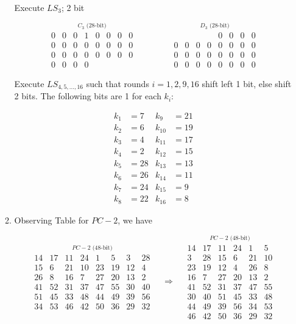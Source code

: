 \documentclass[12pt]{article}
\begin{document}
\begin{enumerate}
\begin{enumerate}
			Execute $LS_3$; 2 bit
			
			\[
			\stackrel{\mbox{$C_3$ (28-bit)}}{
				\begin{matrix}
					0&0&0&1&0&0&0&0\\ 
					0&0&0&0&0&0&0&0\\
					0&0&0&0&0&0&0&0\\
					0&0&0&0
				\end{matrix}}\quad\quad\quad\quad
			\stackrel{\mbox{$D_3$ (28-bit)}}{
				\begin{matrix}
					{}&{}&{}&{}&0&0&0&0\\ 
					0&0&0&0&0&0&0&0\\
					0&0&0&0&0&0&0&0\\
					0&0&0&0&0&0&0&0
				\end{matrix}}
			\]
			
			\newpage
			Execute $LS_{4,5,...,16}$ such that rounds $i=1,2,9,16$ shift left 1 bit, else shift 2 bits. The following bits are 1 for each $k_i$:
			
			\begin{align*}
			k_1 &= 7 & k_9 &= 21\\
			k_2 &= 6 & k_{10} &= 19\\
			k_3 &= 4 & k_{11} &= 17\\
			k_4 &= 2 & k_{12} &= 15\\
			k_5 &= 28 & k_{13} &= 13\\
			k_6 &= 26 & k_{14} &= 11\\
			k_7 &= 24 & k_{15} &= 9\\
			k_8 &= 22 & k_{16} &= 8
			\end{align*}
			
		\item
			Observing Table for $PC-2$, we have
			
			\[
			\stackrel{\mbox{$PC-2$ (48-bit)}}{
				\begin{matrix}
					14&17&11&24&1&5&3&28\\ 
					15&6&21&10&23&19&12&4\\
					26&8&16&7&27&20&13&2\\
					41&52&31&37&47&55&30&40\\
					51&45&33&48&44&49&39&56\\
					34&53&46&42&50&36&29&32
				\end{matrix}}
			\quad\Rightarrow\quad
			\stackrel{\mbox{$PC-2$ (48-bit)}}{
				\begin{matrix}
					14&17&11&24&1&5\\
					3&28&15&6&21&10\\
					23&19&12&4&26&8\\
					16&7&27&20&13&2\\
					41&52&31&37&47&55\\
					30&40&51&45&33&48\\
					44&49&39&56&34&53\\
					46&42&50&36&29&32
				\end{matrix}}
			\]
			

\end{enumerate}
\end{enumerate}
\end{document}
